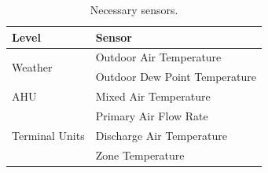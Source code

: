 \begin{table}
\centering
\begin{tabular}{l l}
\toprule
Level & Sensor \\
\midrule\midrule
\multirow{2}{*}{Weather} & Outdoor Air Temperature \\
 & Outdoor Dew Point Temperature \\ \midrule
\multirow{1}{*}{AHU}              & Mixed Air Temperature      \\
\midrule
\multirow{3}{*}{Terminal Units}  & Primary Air Flow Rate     \\
                                 & Discharge Air Temperature \\
                                 & Zone Temperature          \\
\bottomrule
\end{tabular}
\caption{Necessary sensors.}
\label{tab:NecessarySensors}
\end{table}



%
%
%
%
%
%
%
%


